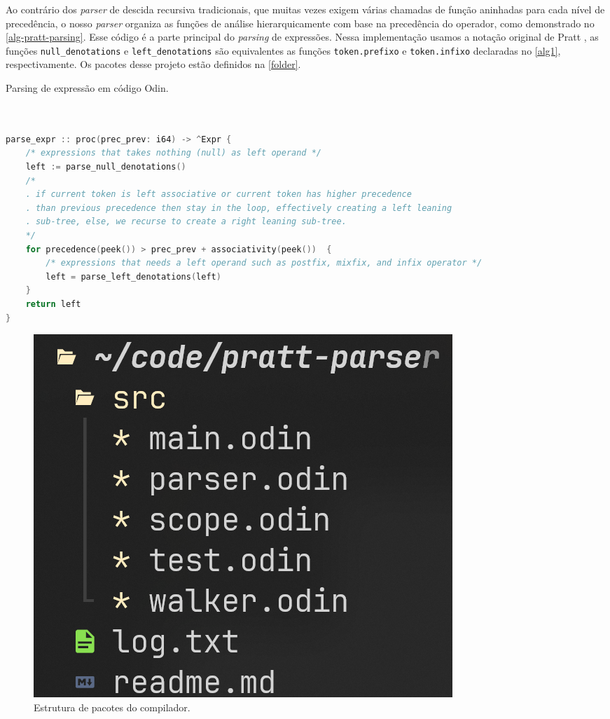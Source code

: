 \documentclass[english, 
               brazil, 
               bsc] %
               {dcomp-abntex2}
\begin{document}
Ao contrário dos \textit{parser} de descida recursiva tradicionais, que muitas vezes exigem várias chamadas de função aninhadas para cada nível de precedência, o nosso \textit{parser} organiza as funções de análise hierarquicamente com base na precedência do operador, como demonstrado no \autoref{alg-pratt-parsing}. Esse código é a parte principal do \textit{parsing} de expressões. Nessa implementação usamos a notação original de Pratt \cite{pratt}, as funções \texttt{null\_denotations} e \texttt{left\_denotations} são equivalentes as funções \texttt{token.prefixo} e \texttt{token.infixo} declaradas no \autoref{alg1}, respectivamente. Os pacotes desse projeto estão definidos na \autoref{folder}.




\begin{codigo}[H]
  \caption{\small Parsing de expressão em código Odin.}
        \label{alg-pratt-parsing}
  \begin{lstlisting}[language=C]


parse_expr :: proc(prec_prev: i64) -> ^Expr {
    /* expressions that takes nothing (null) as left operand */
    left := parse_null_denotations() 
    /*
    . if current token is left associative or current token has higher precedence
    . than previous precedence then stay in the loop, effectively creating a left leaning
    . sub-tree, else, we recurse to create a right leaning sub-tree.
    */
    for precedence(peek()) > prec_prev + associativity(peek())  {
        /* expressions that needs a left operand such as postfix, mixfix, and infix operator */
        left = parse_left_denotations(left)
    }
    return left
}


  \end{lstlisting}
\end{codigo}


\begin{figure}[H]
        \caption{\label{folder} \small Estrutura de pacotes do compilador.}
        \begin{center}
            \includegraphics[scale=0.5]{./Imagens/folder_structuer_odin_parser_lexer.png}
        \end{center}
\end{figure}
\end{document}
